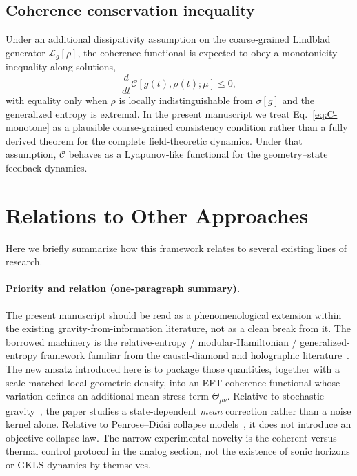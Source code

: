 \documentclass[aps,prd,twocolumn,superscriptaddress,nofootinbib,floatfix]{revtex4-2}
\newcommand{\Cfunc}{\mathcal{C}}
\begin{document}
\subsection{Coherence conservation inequality}

Under an additional dissipativity assumption on the coarse-grained Lindblad generator $\mathcal{L}_g[\rho]$, the coherence functional is expected to obey a monotonicity inequality along solutions,
\begin{equation}
    \frac{d}{dt}\Cfunc[g(t),\rho(t);\mu]
    \le 0,
    \label{eq:C-monotone}
\end{equation}
with equality only when $\rho$ is locally indistinguishable from $\sigma[g]$ and the generalized entropy is extremal.
In the present manuscript we treat Eq.~\eqref{eq:C-monotone} as a plausible coarse-grained consistency condition rather than a fully derived theorem for the complete field-theoretic dynamics. Under that assumption, $\Cfunc$ behaves as a Lyapunov-like functional for the geometry--state feedback dynamics.


\section{Relations to Other Approaches}
\label{sec:relations}

Here we briefly summarize how this framework relates to several existing lines of research.

\paragraph{Priority and relation (one-paragraph summary).}
The present manuscript should be read as a phenomenological extension within the existing gravity-from-information literature, not as a clean break from it. The borrowed machinery is the relative-entropy / modular-Hamiltonian / generalized-entropy framework familiar from the causal-diamond and holographic literature~\cite{Casini2008,Casini2011,FaulknerLewkowyczMaldacena2013}. The new ansatz introduced here is to package those quantities, together with a scale-matched local geometric density, into an EFT coherence functional whose variation defines an additional mean stress term $\Theta_{\mu\nu}$. Relative to stochastic gravity~\cite{HuVerdaguer2008}, the paper studies a state-dependent \emph{mean} correction rather than a noise kernel alone. Relative to Penrose--Di\'{o}si collapse models~\cite{Penrose1996,Diosi1989}, it does not introduce an objective collapse law. The narrow experimental novelty is the coherent-versus-thermal control protocol in the analog section, not the existence of sonic horizons or GKLS dynamics by themselves.
\end{document}
